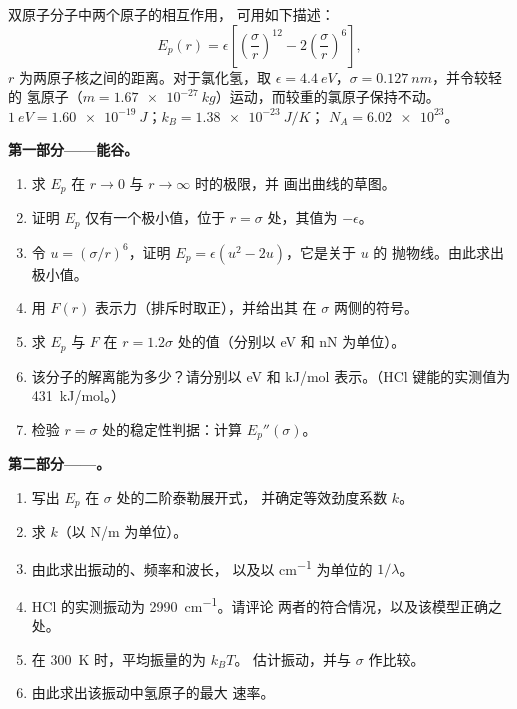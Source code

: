 \begin{problem}
\label{pb:b1:work-and-energy:1}
双原子分子中两个原子的相互作用，
可用如下描述：
\[
E_p(r) = \epsilon\left[\left(\frac{\sigma}{r}\right)^{12} - 2\left(\frac{\sigma}{r}\right)^{6}\right],
\]
$r$ 为两原子核之间的距离。对于氯化氢，取
$\epsilon = \qty{4.4}{eV}$，$\sigma = \qty{0.127}{nm}$，并令较轻的
氢原子（$m = \qty{1.67e-27}{kg}$）运动，而较重的氯原子保持不动。
$\qty{1}{eV} = \qty{1.60e-19}{J}$；$k_B = \qty{1.38e-23}{J/K}$；
$N_A = \num{6.02e23}$。

\medskip
\noindent\textbf{第一部分——能谷。}
\begin{enumerate}
  \item 求 $E_p$ 在 $r \to 0$ 与 $r \to \infty$ 时的极限，并
        画出曲线的草图。
  \item 证明 $E_p$ 仅有一个极小值，位于 $r = \sigma$ 处，其值为
        $-\epsilon$。
  \item 令 $u = (\sigma/r)^6$，证明 $E_p = \epsilon(u^2 - 2u)$，它是关于 $u$ 的
        抛物线。由此求出极小值。
  \item 用 $F(r)$ 表示力（排斥时取正），并给出其
        在 $\sigma$ 两侧的符号。
  \item 求 $E_p$ 与 $F$ 在 $r = 1.2\sigma$ 处的值（分别以 eV 和 nN 为单位）。
  \item 该分子的解离能为多少？请分别以 eV 和
        \unit{kJ/mol} 表示。（HCl 键能的实测值为 \qty{431}{kJ/mol}。）
  \item 检验 $r = \sigma$ 处的稳定性判据：计算
        $E_p''(\sigma)$。
\end{enumerate}

\medskip
\noindent\textbf{第二部分——。}
\begin{enumerate}[resume]
  \item 写出 $E_p$ 在 $\sigma$ 处的二阶泰勒展开式，
        并确定等效劲度系数 $k$。
  \item 求 $k$（以 \unit{N/m} 为单位）。
  \item 由此求出振动的、频率和波长，
        以及以 \unit{cm^{-1}} 为单位的 $1/\lambda$。
  \item HCl 的实测振动为 \qty{2990}{cm^{-1}}。请评论
        两者的符合情况，以及该模型正确之处。
  \item 在 \qty{300}{K} 时，平均振量的为 $k_BT$。
        估计振动，并与 $\sigma$ 作比较。
  \item 由此求出该振动中氢原子的最大
        速率。
\end{enumerate}


\end{problem}
